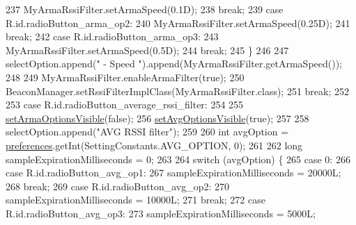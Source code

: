 \begin{DoxyCode}
237                         MyArmaRssiFilter.setArmaSpeed(0.1D);
238                         \textcolor{keywordflow}{break};
239                     \textcolor{keywordflow}{case} R.id.radioButton\_arma\_op2:
240                         MyArmaRssiFilter.setArmaSpeed(0.25D);
241                         \textcolor{keywordflow}{break};
242                     \textcolor{keywordflow}{case} R.id.radioButton\_arma\_op3:
243                         MyArmaRssiFilter.setArmaSpeed(0.5D);
244                         \textcolor{keywordflow}{break};
245                 \}
246 
247                 selectOption.append(\textcolor{stringliteral}{" - Speed "}).append(MyArmaRssiFilter.getArmaSpeed());
248 
249                 MyArmaRssiFilter.enableArmaFilter(\textcolor{keyword}{true});
250                 BeaconManager.setRssiFilterImplClass(MyArmaRssiFilter.class);
251                 \textcolor{keywordflow}{break};
252 
253             \textcolor{keywordflow}{case} R.id.radioButton\_average\_rssi\_filter:
254 
255                 \hyperlink{classit_1_1unibo_1_1torsello_1_1bluetoothpositioning_1_1activities_1_1ApplicationActivity_a53f68b9ea3a7805d43d4d2c84a920871_a53f68b9ea3a7805d43d4d2c84a920871}{setArmaOptionsVisible}(\textcolor{keyword}{false});
256                 \hyperlink{classit_1_1unibo_1_1torsello_1_1bluetoothpositioning_1_1activities_1_1ApplicationActivity_ab50a70cb5d2d98211598b297a10bc44f_ab50a70cb5d2d98211598b297a10bc44f}{setAvgOptionsVisible}(\textcolor{keyword}{true});
257 
258                 selectOption.append(\textcolor{stringliteral}{"AVG RSSI filter"});
259 
260                 \textcolor{keywordtype}{int} avgOption = \hyperlink{classit_1_1unibo_1_1torsello_1_1bluetoothpositioning_1_1activities_1_1ApplicationActivity_a3ee672ef79c268d0618ff3276c2e85f0_a3ee672ef79c268d0618ff3276c2e85f0}{preferences}.getInt(SettingConstants.AVG\_OPTION, 0);
261 
262                 \textcolor{keywordtype}{long} sampleExpirationMilliseconds = 0;
263 
264                 \textcolor{keywordflow}{switch} (avgOption) \{
265                     \textcolor{keywordflow}{case} 0:
266                     \textcolor{keywordflow}{case} R.id.radioButton\_avg\_op1:
267                         sampleExpirationMilliseconds = 20000L;
268                         \textcolor{keywordflow}{break};
269                     \textcolor{keywordflow}{case} R.id.radioButton\_avg\_op2:
270                         sampleExpirationMilliseconds = 10000L;
271                         \textcolor{keywordflow}{break};
272                     \textcolor{keywordflow}{case} R.id.radioButton\_avg\_op3:
273                         sampleExpirationMilliseconds = 5000L;

\end{DoxyCode}
